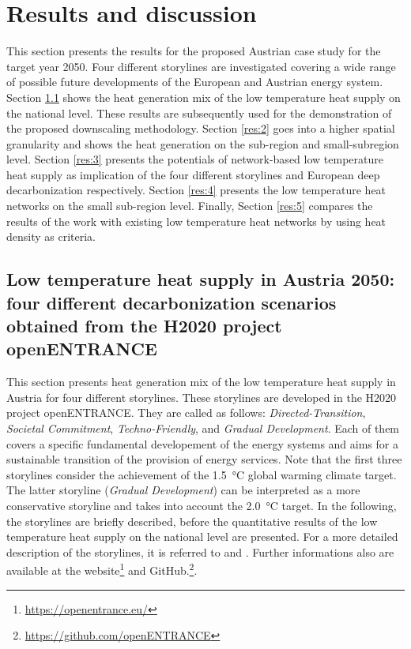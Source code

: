 \section{Results and discussion}
This section presents the results for the proposed Austrian case study for the target year 2050. Four different storylines are investigated covering a wide range of possible future developments of the European and Austrian energy system. Section \ref{res:1} shows the heat generation mix of the low temperature heat supply on the national level. These results are subsequently used for the demonstration of the proposed downscaling methodology. Section \ref{res:2} goes into a higher spatial granularity and shows the heat generation on the sub-region and small-subregion level. Section \ref{res:3} presents the potentials of network-based low temperature heat supply as implication of the four different storylines and European deep decarbonization respectively. Section \ref{res:4} presents the low temperature heat networks on the small sub-region level. Finally, Section \ref{res:5} compares the results of the work with existing low temperature heat networks by using heat density as criteria.

\subsection{Low temperature heat supply in Austria 2050: four different decarbonization scenarios obtained from the H2020 project openENTRANCE}\label{res:1}
This section presents heat generation mix of the low temperature heat supply in Austria for four different storylines. These storylines are developed in the H2020 project openENTRANCE. They are called as follows: \textit{Directed-Transition}, \textit{Societal Commitment}, \textit{Techno-Friendly}, and \textit{Gradual Development}. Each of them covers a specific fundamental developement of the energy systems and aims for a sustainable transition of the provision of energy services. Note that the first three storylines consider the achievement of the \SI{1.5}{\degreeCelsius} global warming climate target. The latter storyline (\textit{Gradual Development}) can be interpreted as a more conservative storyline and takes into account the \SI{2.0}{\degreeCelsius} target. In the following, the storylines are briefly described, before the quantitative results of the low temperature heat supply on the national level are presented. For a more detailed description of the storylines, it is referred to \cite{auer2020quantitative} and \cite{auer2020development}. Further informations also are available at the website\footnote{\url{https://openentrance.eu/}} and GitHub.\footnote{\url{https://github.com/openENTRANCE}}.\newline


